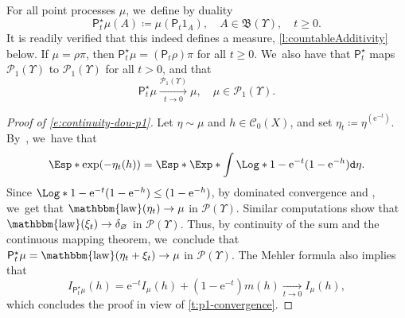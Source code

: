 \documentclass[JEP,XML,SOM,Unicode,published]{cedram}
\theoremstyle{definition}
\theoremstyle{remark}
\DeclareMathOperator{\law}{\mathbbm{law}}
\begin{document}
For all point processes $\mu$, we~define by duality
\begin{equation*}
\mathsf{P}^{\star}_{t} \mu(A) \coloneq \mu(\mathsf{P}_{t}1_{A}), \quad A \in \mathfrak{B}(\varUpsilon),\quad t \ge 0.
\end{equation*}
It is readily verified that this indeed defines a measure, \cf \cref{l:countableAdditivity} below.
If $\mu = \rho \pi$, then $\mathsf{P}^{\star}_{t}\mu = (\mathsf{P}_{t} \rho) \pi$ for all $t \ge 0$. We~also have that $\mathsf{P}^{\star}_{t}$ maps $\mathscr{P}_{1}(\varUpsilon)$ to $\mathscr{P}_{1}(\varUpsilon)$ for all $t > 0$, and that
\begin{equation}\label{e:continuity-dou-p1}
\mathsf{P}^{\star}_{t}\mu \xrightarrow[t \to 0]{\mathscr{P}_{1}(\varUpsilon)} \mu, \quad \mu \in \mathscr{P}_{1}(\varUpsilon).
\end{equation}
\begin{proof}[Proof of \cref{e:continuity-dou-p1}]
Let $\eta \sim \mu$ and $h \in \mathscr{C}_{0}(X)$, and set $\eta_{t} \coloneq \eta^{(\mathrm{e}^{-t})}$.
By~\cite[Lem.\,3.1]{Kallenberg}, we~have that
\begin{equation}\label{e:LaplaceThinning}
\Esp*{ \exp(-\eta_{t}(h)) } = \Esp*{ \Exp*{ \int \Log*{1 - \mathrm{e}^{-t}(1 - \mathrm{e}^{-h})} \mathtt{d} \eta } }.
\end{equation}
Since $\Log*{ 1 - \mathrm{e}^{-t}(1 - \mathrm{e}^{-h}) } \leq (1-\mathrm{e}^{-h})$, by dominated convergence and \cite[Th.\,4.11]{Kallenberg}, we~get that $\law(\eta_{t}) \to \mu$ in $\mathscr{P}(\varUpsilon)$.
Similar computations show that $\law(\xi_{t}) \to \delta_{\varnothing}$ in $\mathscr{P}(\varUpsilon)$.
Thus, by continuity of the sum and the continuous mapping theorem, we~conclude that $\mathsf{P}^{\star}_{t}\mu = \law(\eta_{t} + \xi_{t}) \to \mu$ in $\mathscr{P}(\varUpsilon)$.
The Mehler formula also implies that
\begin{equation}\label{e:intensity-Ornstein-Uhlenbeck}
I_{\mathsf{P}^{\star}_{t}\mu}(h) = \mathrm{e}^{-t} I_{\mu}(h) + (1-\mathrm{e}^{-t}) m(h) \xrightarrow[t \to 0]{} I_{\mu}(h),
\end{equation}
which concludes the proof in view of \cref{t:p1-convergence}.
\end{proof}
\end{document}

